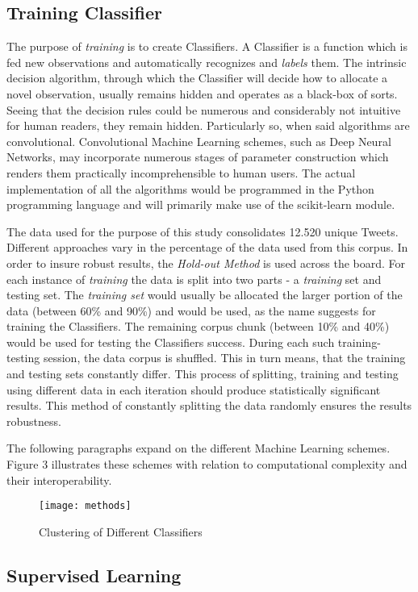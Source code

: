 	\subsection{Training Classifier}
	The purpose of \textit{training} is to create Classifiers. A Classifier is a function which is fed  new observations and automatically recognizes and \textit{labels} them. The intrinsic decision algorithm, through which the Classifier will decide how to allocate a novel observation, usually remains hidden and operates as a black-box of sorts. Seeing that the decision rules could be numerous and considerably not intuitive for human readers, they remain hidden. Particularly so, when said algorithms are convolutional. Convolutional Machine Learning schemes, such as Deep Neural Networks, may incorporate numerous stages of parameter construction which renders them practically incomprehensible to human users. The actual implementation of all the algorithms would be programmed in the Python programming language and will primarily make use of the scikit-learn\cite{scikit-learn} module.
	\par
	The data used for the purpose of this study consolidates 12.520 unique Tweets. Different approaches vary in the percentage of the data used from this corpus. In order to insure robust results, the \textit{Hold-out Method} is used across the board. For each instance of \textit{training} the data is split into two parts - a \textit{training} set and testing set. The \textit{training set} would usually be allocated the larger portion of the data (between 60\% and 90\%) and would be used, as the name suggests for training the Classifiers. The remaining corpus chunk (between 10\% and 40\%) would be used for testing the Classifiers success. During each such training-testing session, the data corpus is shuffled. This in turn means, that the training and testing sets constantly differ. This process of splitting, training and testing using different data in each iteration should produce statistically significant results. This method of constantly splitting the data randomly ensures the results robustness.
	\par
	The following paragraphs expand on the different Machine Learning schemes. Figure 3 illustrates these schemes with relation to computational complexity and their interoperability.
	
	\begin{figure}[h]
		\centering
		\texttt{[image: methods]}
		\captionsetup{width=0.8\textwidth}
		\caption{Clustering of Different Classifiers}
	\end{figure}
	
	\subsection{Supervised Learning}
	
	
	
	
	
	

	
	
	
	
	
	
	
	
	
	
	
	
		
	